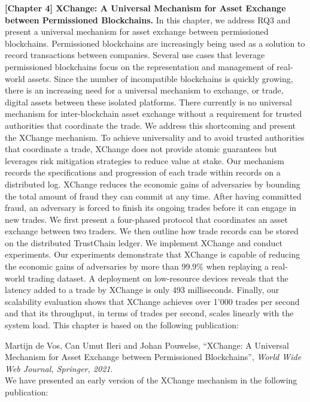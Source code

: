 \textbf{[Chapter 4] XChange: A Universal Mechanism for Asset Exchange between Permissioned Blockchains.}
In this chapter, we address RQ3 and present a universal mechanism for asset exchange between permissioned blockchains.
Permissioned blockchains are increasingly being used as a solution to record transactions between companies.
Several use cases that leverage permissioned blockchains focus on the representation and management of real-world assets.
Since the number of incompatible blockchains is quickly growing, there is an increasing need for a universal mechanism to exchange, or trade, digital assets between these isolated platforms.
There currently is no universal mechanism for inter-blockchain asset exchange without a requirement for trusted authorities that coordinate the trade.
We address this shortcoming and present the XChange mechanism.
To achieve universality and to avoid trusted authorities that coordinate a trade, XChange does not provide atomic guarantees but leverages risk mitigation strategies to reduce value at stake.
Our mechanism records the specifications and progression of each trade within records on a distributed log.
XChange reduces the economic gains of adversaries by bounding the total amount of fraud they can commit at any time.
After having committed fraud, an adversary is forced to finish its ongoing trades before it can engage in new trades.
We first present a four-phased protocol that coordinates an asset exchange between two traders.
We then outline how trade records can be stored on the distributed TrustChain ledger.
We implement XChange and conduct experiments.
Our experiments demonstrate that XChange is capable of reducing the economic gains of adversaries by more than 99.9\% when replaying a real-world trading dataset.
A deployment on low-resource devices reveals that the latency added to a trade by XChange is only 493 milliseconds.
Finally, our scalability evaluation shows that XChange achieves over 1’000 trades per second and that its throughput, in terms of trades per second, scales linearly with the system load.
This chapter is based on the following publication:

Martijn de Vos, Can Umut Ileri and Johan Pouwelse, \enquote{XChange: A Universal Mechanism for Asset Exchange between Permissioned Blockchains}, \emph{World Wide Web Journal, Springer, 2021}.\\

\noindent We have presented an early version of the XChange mechanism in the following publication:\\

